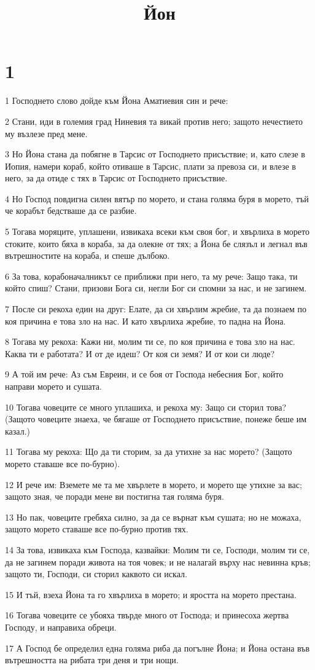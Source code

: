 

\title{Йон}


\chapter{1}

\par 1 Господнето слово дойде към Йона Аматиевия син и рече:
\par 2 Стани, иди в големия град Ниневия та викай против него; защото нечестието му възлезе пред мене.
\par 3 Но Йона стана да побягне в Тарсис от Господнето присъствие; и, като слезе в Иопия, намери кораб, който отиваше в Тарсис, плати за превоза си, и влезе в него, за да отиде с тях в Тарсис от Господнето присъствие.
\par 4 Но Господ повдигна силен вятър по морето, и стана голяма буря в морето, тъй че корабът бедстваше да се разбие.
\par 5 Тогава моряците, уплашени, извикаха всеки към своя бог, и хвърлиха в морето стоките, които бяха в кораба, за да олекне от тях; а Йона бе слязъл и легнал във вътрешностите на кораба, и спеше дълбоко.
\par 6 За това, корабоначалникът се приближи при него, та му рече: Защо така, ти който спиш? Стани, призови Бога си, негли Бог си спомни за нас, и не загинем.
\par 7 После си рекоха един на друг: Елате, да си хвърлим жребие, та да познаем по коя причина е това зло на нас. И като хвърлиха жребие, то падна на Йона.
\par 8 Тогава му рекоха: Кажи ни, молим ти се, по коя причина е това зло на нас. Каква ти е работата? И от де идеш? От коя си земя? И от кои си люде?
\par 9 А той им рече: Аз съм Евреин, и се боя от Господа небесния Бог, който направи морето и сушата.
\par 10 Тогава човеците се много уплашиха, и рекоха му: Защо си сторил това? (Защото човеците знаеха, че бягаше от Господнето присъствие, понеже беше им казал.)
\par 11 Тогава му рекоха: Що да ти сторим, за да утихне за нас морето? (Защото морето ставаше все по-бурно).
\par 12 И рече им: Вземете ме та ме хвърлете в морето, и морето ще утихне за вас; защото зная, че поради мене ви постигна тая голяма буря.
\par 13 Но пак, човеците гребяха силно, за да се върнат към сушата; но не можаха, защото морето ставаше все по-бурно против тях.
\par 14 За това, извикаха към Господа, казвайки: Молим ти се, Господи, молим ти се, да не загинем поради живота на тоя човек; и не налагай върху нас невинна кръв; защото ти, Господи, си сторил каквото си искал.
\par 15 И тъй, взеха Йона та го хвърлиха в морето; и яростта на морето престана.
\par 16 Тогава човеците се убояха твърде много от Господа; и принесоха жертва Господу, и направиха обреци.
\par 17 А Господ бе определил една голяма риба да погълне Йона; и Йона остана във вътрешността на рибата три деня и три нощи.

